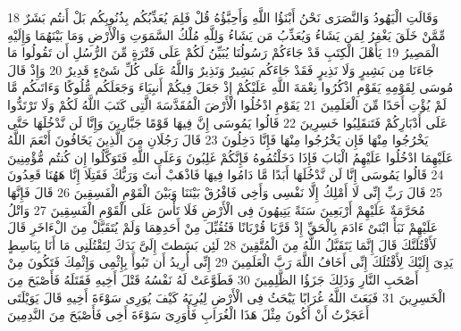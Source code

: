 \documentclass[20pt,a4paper]{article}
\begin{document}
{\tiny\colorbox{cl_aya}{18}} وَقَالَتِ الْيَهُودُ وَالنَّصَرَى نَحْنُ أَبْنَؤُا اللَّهِ وَأَحِبَّؤُهُ قُلْ فَلِمَ يُعَذِّبُكُم بِذُنُوبِكُم بَلْ أَنتُم بَشَرٌ مِّمَّنْ خَلَقَ يَغْفِرُ لِمَن يَشَاءُ وَيُعَذِّبُ مَن يَشَاءُ وَلِلَّهِ مُلْكُ السَّمَوَتِ وَالْأَرْضِ وَمَا بَيْنَهُمَا وَإِلَيْهِ الْمَصِيرُ
{\tiny\colorbox{cl_aya}{19}} يَأَهْلَ الْكِتَبِ قَدْ جَاءَكُمْ رَسُولُنَا يُبَيِّنُ لَكُمْ عَلَى فَتْرَةٍ مِّنَ الرُّسُلِ أَن تَقُولُوا مَا جَاءَنَا مِن بَشِيرٍ وَلَا نَذِيرٍ فَقَدْ جَاءَكُم بَشِيرٌ وَنَذِيرٌ وَاللَّهُ عَلَى كُلِّ شَىْءٍ قَدِيرٌ
{\tiny\colorbox{cl_aya}{20}} وَإِذْ قَالَ مُوسَى لِقَوْمِهِ يَقَوْمِ اذْكُرُوا نِعْمَةَ اللَّهِ عَلَيْكُمْ إِذْ جَعَلَ فِيكُمْ أَنبِيَاءَ وَجَعَلَكُم مُّلُوكًا وَءَاتَىكُم مَّا لَمْ يُؤْتِ أَحَدًا مِّنَ الْعَلَمِينَ
{\tiny\colorbox{cl_aya}{21}} يَقَوْمِ ادْخُلُوا الْأَرْضَ الْمُقَدَّسَةَ الَّتِى كَتَبَ اللَّهُ لَكُمْ وَلَا تَرْتَدُّوا عَلَى أَدْبَارِكُمْ فَتَنقَلِبُوا خَسِرِينَ
{\tiny\colorbox{cl_aya}{22}} قَالُوا يَمُوسَى إِنَّ فِيهَا قَوْمًا جَبَّارِينَ وَإِنَّا لَن نَّدْخُلَهَا حَتَّى يَخْرُجُوا مِنْهَا فَإِن يَخْرُجُوا مِنْهَا فَإِنَّا دَخِلُونَ
{\tiny\colorbox{cl_aya}{23}} قَالَ رَجُلَانِ مِنَ الَّذِينَ يَخَافُونَ أَنْعَمَ اللَّهُ عَلَيْهِمَا ادْخُلُوا عَلَيْهِمُ الْبَابَ فَإِذَا دَخَلْتُمُوهُ فَإِنَّكُمْ غَلِبُونَ وَعَلَى اللَّهِ فَتَوَكَّلُوا إِن كُنتُم مُّؤْمِنِينَ
{\tiny\colorbox{cl_aya}{24}} قَالُوا يَمُوسَى إِنَّا لَن نَّدْخُلَهَا أَبَدًا مَّا دَامُوا فِيهَا فَاذْهَبْ أَنتَ وَرَبُّكَ فَقَتِلَا إِنَّا هَهُنَا قَعِدُونَ
{\tiny\colorbox{cl_aya}{25}} قَالَ رَبِّ إِنِّى لَا أَمْلِكُ إِلَّا نَفْسِى وَأَخِى فَافْرُقْ بَيْنَنَا وَبَيْنَ الْقَوْمِ الْفَسِقِينَ
{\tiny\colorbox{cl_aya}{26}} قَالَ فَإِنَّهَا مُحَرَّمَةٌ عَلَيْهِمْ أَرْبَعِينَ سَنَةً يَتِيهُونَ فِى الْأَرْضِ فَلَا تَأْسَ عَلَى الْقَوْمِ الْفَسِقِينَ
{\tiny\colorbox{cl_aya}{27}} وَاتْلُ عَلَيْهِمْ نَبَأَ ابْنَىْ ءَادَمَ بِالْحَقِّ إِذْ قَرَّبَا قُرْبَانًا فَتُقُبِّلَ مِنْ أَحَدِهِمَا وَلَمْ يُتَقَبَّلْ مِنَ الْءَاخَرِ قَالَ لَأَقْتُلَنَّكَ قَالَ إِنَّمَا يَتَقَبَّلُ اللَّهُ مِنَ الْمُتَّقِينَ
{\tiny\colorbox{cl_aya}{28}} لَئِن بَسَطتَ إِلَىَّ يَدَكَ لِتَقْتُلَنِى مَا أَنَا بِبَاسِطٍ يَدِىَ إِلَيْكَ لِأَقْتُلَكَ إِنِّى أَخَافُ اللَّهَ رَبَّ الْعَلَمِينَ
{\tiny\colorbox{cl_aya}{29}} إِنِّى أُرِيدُ أَن تَبُوأَ بِإِثْمِى وَإِثْمِكَ فَتَكُونَ مِنْ أَصْحَبِ النَّارِ وَذَلِكَ جَزَؤُا الظَّلِمِينَ
{\tiny\colorbox{cl_aya}{30}} فَطَوَّعَتْ لَهُ نَفْسُهُ قَتْلَ أَخِيهِ فَقَتَلَهُ فَأَصْبَحَ مِنَ الْخَسِرِينَ
{\tiny\colorbox{cl_aya}{31}} فَبَعَثَ اللَّهُ غُرَابًا يَبْحَثُ فِى الْأَرْضِ لِيُرِيَهُ كَيْفَ يُوَرِى سَوْءَةَ أَخِيهِ قَالَ يَوَيْلَتَى أَعَجَزْتُ أَنْ أَكُونَ مِثْلَ هَذَا الْغُرَابِ فَأُوَرِىَ سَوْءَةَ أَخِى فَأَصْبَحَ مِنَ النَّدِمِينَ
\end{document}
